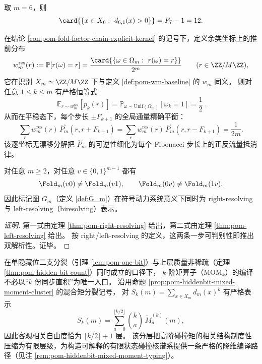 \begin{corollary}[\texorpdfstring{$m=6$}{m=6} 的数值实例：上层可行类型数为 \texorpdfstring{$12$}{12}]\label{cor:pom-hiddenbit-upper-support-m6-12}
取 \(m=6\)，则
\[
\card{\{x\in X_6:\ d_{6,1}(x)>0\}}=F_7-1=12.
\]
\end{corollary}

\begin{conclusion}\label{con:pom-fold-factor-chain-no-drift}
在结论 \ref{con:pom-fold-factor-chain-explicit-kernel} 的记号下，定义余类坐标上的推前分布
\[
w_m^{\mathrm{res}}(r):=\mathbb P[r(\omega)=r]=\frac{\card{\{\omega\in\Omega_m:\ r(\omega)=r\}}}{2^m}\qquad(r\in\ZZ/M\ZZ),
\]
它在识别 \(X_m\simeq\ZZ/M\ZZ\) 下与定义 \ref{def:pom-wm-baseline} 的 \(w_m\) 同义。
则对任意 \(1\le k\le m\) 有严格恒等式
\[
\boxed{\;
\mathbb E_{r\sim w_m^{\mathrm{res}}}[p_k(r)]
=\mathbb P_{\omega\sim\mathrm{Unif}(\Omega_m)}[\omega_k=1]
=\frac12\; }.
\]
从而在平稳态下，每个步长 \(\pm F_{k+1}\) 的全局通量精确平衡：
\[
\sum_{r}w_m^{\mathrm{res}}(r)\,\overline P_m^{\square}(r,r+F_{k+1})
=\sum_{r}w_m^{\mathrm{res}}(r)\,\overline P_m^{\square}(r,r-F_{k+1})
=\frac{1}{2m}.
\]
该逐坐标无漂移分解把 \(\overline P_m^{\square}\) 的可逆性细化为每个 Fibonacci 步长上的正反流量抵消律。
\end{conclusion}

\begin{conclusion}\label{con:pom-fold-biresolving}
对任意 \(m\ge 2\)，对任意 \(v\in\{0,1\}^{m-1}\) 都有
\[
\Fold_m(v0)\ne \Fold_m(v1),\qquad
\Fold_m(0v)\ne \Fold_m(1v).
\]
因此标记图 \(G_m\)（定义 \ref{def:G_m}）在符号动力系统意义下同时为 right-resolving 与 left-resolving（biresolving）表示。
\end{conclusion}
\begin{proof}[证明]
第一式由定理 \ref{thm:pom-right-resolving} 给出，第二式由定理 \ref{thm:pom-left-resolving} 给出。
按 right/left-resolving 的定义，这两条一步可判别性即推出双解析性。证毕。
\end{proof}

\begin{conclusion}\label{con:pom-hidden-bit-moment-compilation-dim-reduction}
在单隐藏位二支分裂（引理 \ref{lem:pom-one-bit}）与上层质量非稀疏（定理 \ref{thm:pom-hidden-bit-count}）同时成立的口径下，
\(k\)-阶矩算子（\(\mathrm{MOM}_k\)）的编译不必以“\(k\) 份同步直积”为唯一入口。
沿用命题 \ref{prop:pom-hiddenbit-mixed-moment-cluster} 的混合矩分裂记号，
对
\(
S_k(m)=\sum_{x\in X_m}d_m(x)^k
\)
有严格表示
\[
S_k(m)=\sum_{a=0}^{\lfloor k/2\rfloor}\binom{k}{a}\,\widetilde M_a^{(k)}(m),
\]
因此客观相关自由度恰为 \(\lfloor k/2\rfloor+1\) 层。
该分层把高阶碰撞矩的相关结构制度性压缩为有限层级，为构造可解释的有限状态碰撞核谱系提供一条严格的降维编译路径（见注 \ref{rem:pom-hiddenbit-mixed-moment-typing}）。
\end{conclusion}


